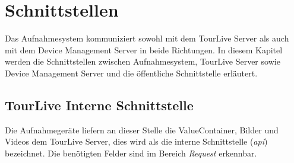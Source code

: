 \chapter{Schnittstellen}

Das Aufnahmesystem kommuniziert sowohl mit dem TourLive Server als auch mit dem Device Management Server in beide Richtungen. In diesem Kapitel werden die Schnittstellen zwischen Aufnahmesystem, TourLive Server sowie Device Management Server und die öffentliche Schnittstelle erläutert.

\section{TourLive Interne Schnittstelle}
\label{sec:tourliveserverapi}
Die Aufnahmegeräte liefern an dieser Stelle die ValueContainer, Bilder und Videos dem TourLive Server, dies wird als die interne Schnittstelle (\textit{\gls{api}}) bezeichnet. Die benötigten Felder sind im Bereich \textit{Request} erkennbar.
